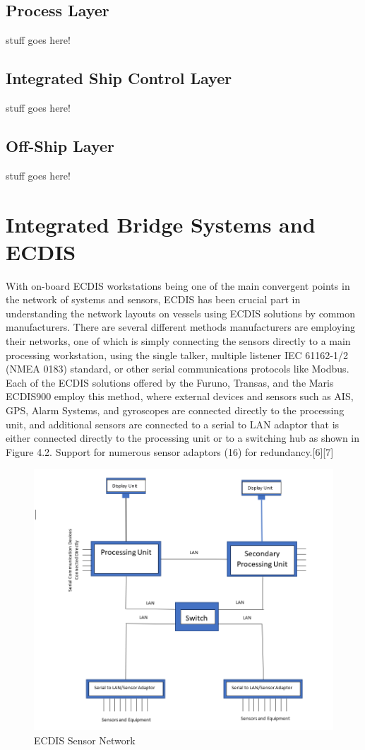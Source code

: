 \documentclass{report}
\begin{document}
\subsection{Process Layer}
stuff goes here!
\subsection{Integrated Ship Control Layer}
stuff goes here!
\subsection{Off-Ship Layer}
stuff goes here!


\section{Integrated Bridge Systems and ECDIS}

With on-board ECDIS workstations being one of the main convergent points in the network of systems and sensors, ECDIS has been crucial part in understanding the network layouts on vessels using ECDIS solutions by common manufacturers. There are several different methods manufacturers are employing their networks, one of which is simply connecting the sensors directly to a main processing workstation, using the single talker, multiple listener IEC 61162-1/2 (NMEA 0183) standard, or other serial communications protocols like Modbus. Each of the ECDIS solutions offered by the Furuno, Transas, and the Maris ECDIS900 employ this method, where external devices and sensors such as AIS, GPS, Alarm Systems, and gyroscopes are connected directly to the processing unit, and additional sensors are connected to a serial to LAN adaptor that is either connected directly to the processing unit or to a switching hub as shown in Figure 4.2. Support for numerous sensor adaptors (16) for redundancy.[6][7]

\begin{figure}[h]
    \centering
    \includegraphics[width=12cm]{Images and Figures/ECDISsensorNetwork.PNG}
    \caption{ECDIS Sensor Network}
    \label{fig:network}
\end{figure}
\end{document}
